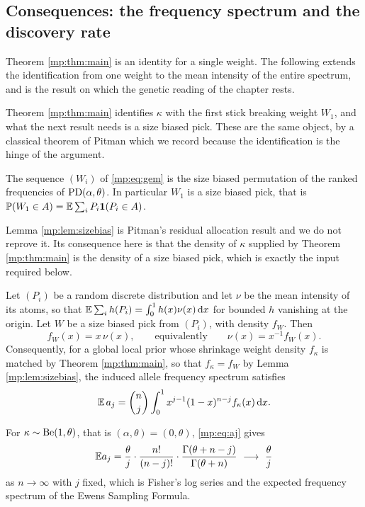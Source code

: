 \subsection{Consequences: the frequency spectrum and the discovery rate}

Theorem \ref{mp:thm:main} is an identity for a single weight. The following extends the identification from one
weight to the mean intensity of the entire spectrum, and is the result on which the genetic reading of the chapter
rests.

Theorem \ref{mp:thm:main} identifies $\kappa$ with the first stick breaking weight $W_1$, and
what the next result needs is a size biased pick. These are the same object, by a classical
theorem of Pitman which we record because the identification is the hinge of the argument.

\begin{lemma}
\label{mp:lem:sizebias}
The sequence $(W_i)$ of \eqref{mp:eq:gem} is the size biased permutation of the ranked
frequencies of $\mathrm{PD}(\alpha,\theta)$. In particular $W_1$ is a size biased pick, that is
$\mathbb{P}(W_1\in A)=\mathbb{E}\sum_i P_i\mathbf 1(P_i\in A)$.
\end{lemma}

Lemma \ref{mp:lem:sizebias} is Pitman's residual allocation result \citep{mp:pitman1996,mp:pitmanyor1997}
and we do not reprove it. Its
consequence here is that the density of $\kappa$ supplied by Theorem \ref{mp:thm:main} is the
density of a size biased pick, which is exactly the input required below.

\begin{theorem}
\label{mp:thm:spectrum}
Let $(P_i)$ be a random discrete distribution and let $\nu$ be the mean intensity of its
atoms, so that $\mathbb{E}\sum_ih(P_i)=\int_0^1h(x)\nu(x)\,\mathrm{d} x$ for bounded $h$ vanishing at the
origin. Let $W$ be a size biased pick from $(P_i)$, with density $f_W$. Then
\[
f_W(x)=x\,\nu(x),\qquad\text{equivalently}\qquad \nu(x)=x^{-1}f_W(x).
\]
Consequently, for a global local prior whose shrinkage weight density $f_\kappa$ is matched
by Theorem \ref{mp:thm:main}, so that $f_\kappa=f_W$ by Lemma \ref{mp:lem:sizebias}, the induced
allele frequency spectrum satisfies
\begin{equation}
\mathbb{E}\,a_j=\binom{n}{j}\int_0^1x^{j-1}(1-x)^{n-j}f_\kappa(x)\,\mathrm{d} x .
\label{mp:eq:aj}
\end{equation}
\end{theorem}

\begin{corollary}
\label{mp:cor:logseries}
For $\kappa\sim\mathrm{Be}(1,\theta)$, that is $(\alpha,\theta)=(0,\theta)$, \eqref{mp:eq:aj} gives
\[
\E a_j=\frac{\theta}{j}\cdot\frac{n!}{(n-j)!}\cdot
\frac{\Gamma(\theta+n-j)}{\Gamma(\theta+n)}\ \longrightarrow\ \frac{\theta}{j}
\]
as $n\to\infty$ with $j$ fixed, which is Fisher's log series and the expected frequency
spectrum of the Ewens Sampling Formula.
\end{corollary}

